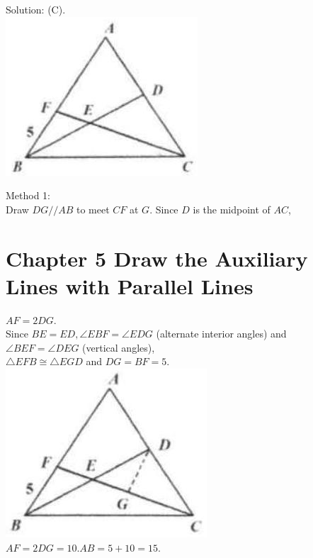 \documentclass[10pt]{article}
\begin{document}
Solution: (C).\\
\includegraphics[max width=\textwidth, center]{2025_04_17_97bc1f7e44d93c271a88g-102(4)}

Method 1:\\
Draw \(D G / / A B\) to meet \(C F\) at \(G\). Since \(D\) is the midpoint of \(A C\),

\section*{Chapter 5 Draw the Auxiliary Lines with Parallel Lines}
\(A F=2 D G\).\\
Since \(B E=E D, \angle E B F=\angle E D G\) (alternate interior angles) and \(\angle B E F=\angle D E G\) (vertical angles),\\
\(\triangle E F B \cong \triangle E G D\) and \(D G=B F=5\).\\
\includegraphics[max width=\textwidth, center]{2025_04_17_97bc1f7e44d93c271a88g-103(1)}\\
\(A F=2 D G=10 . A B=5+10=15\).
\end{document}
